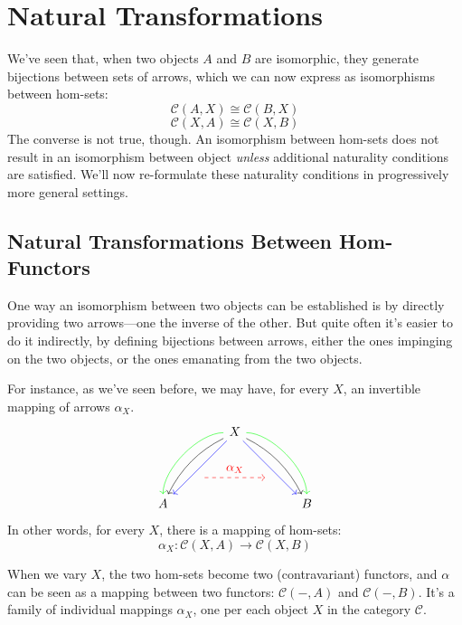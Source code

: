 \documentclass[DaoFP]{subfiles}
\begin{document}
\setcounter{chapter}{8}

\chapter{Natural Transformations}

We've seen that, when two objects $A$ and $B$ are isomorphic, they generate bijections between sets of arrows, which we can now express as isomorphisms between hom-sets:
\[\mathcal{C}(A, X) \cong \mathcal{C}(B, X)\]
\[\mathcal{C}(X, A) \cong \mathcal{C}(X, B)\]
The converse is not true, though. An isomorphism between hom-sets does not result in an isomorphism between object \emph{unless} additional naturality conditions are satisfied. We'll now re-formulate these naturality conditions in progressively more general settings.

\section{Natural Transformations Between Hom-Functors}

One way an isomorphism between two objects can be established is by directly providing two arrows---one the inverse of the other. But quite often it's easier to do it indirectly, by defining bijections between arrows, either the ones impinging on the two objects, or the ones emanating from the two objects. 

For instance, as we've seen before, we may have, for every $X$, an invertible mapping of arrows $\alpha_X$.
\[
 \begin{tikzcd}
 \node(x) at (0, 2) {X};
 \node(a) at (-2, 0) {A};
 \node(b) at (2, 0) {B};
 \node(c1) at (-1, 1.5) {};
 \node(c2) at (-1.5, 1) {};
 \node(c3) at (-1, 2) {};
 \node(c4) at (-2, 1) {};
 \node(d1) at (1, 1.5) {};
 \node(d2) at (1.5, 1) {};
 \node(d3) at (1, 2) {};
 \node(d4) at (2, 1) {};
\node (aa) at (-1, 0.75) {};
 \node (bb) at (1, 0.75) {};
 \draw[->] (x) .. controls (c1)  and (c2) .. (a); %
 \draw[->, green] (x) .. controls (c3)  and (c4) .. (a); %
 \draw[->, blue] (x) -- (a); 
  \draw[->] (x) .. controls (d1)  and (d2) .. (b); %
 \draw[->, green] (x) .. controls (d3)  and (d4) .. (b); %
 \draw[->, blue] (x) -- (b); 
 \draw[->, red, dashed] (aa) -- node[above]{\alpha_X} (bb);
 \end{tikzcd}
\]
In other words, for every $X$, there is a mapping of hom-sets:
\[ \alpha_X \colon \mathcal{C}(X, A) \to \mathcal{C}(X, B) \]

When we vary $X$, the two hom-sets become two (contravariant) functors, and $\alpha$ can be seen as a mapping between two functors:  $\mathcal{C}(-, A)$ and $\mathcal{C}(-, B)$. It's a family of individual mappings $\alpha_X$, one per each object $X$ in the category $\mathcal{C}$. 
\end{document}
